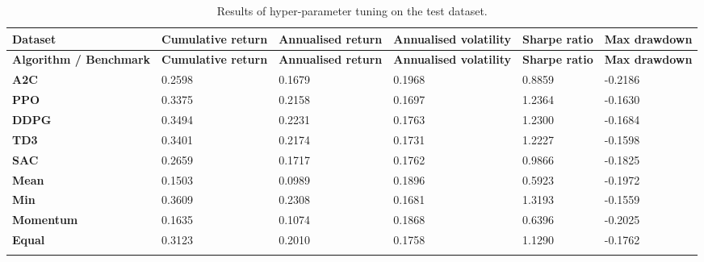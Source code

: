 \begin{longtable}{|p{2cm}|p{2.1cm}|p{2.1cm}|p{2.1cm}|p{1.5cm}|p{2cm}|}
    \hline
    \textbf{Dataset} & \textbf{Cumulative return} & \textbf{Annualised return} & \textbf{Annualised volatility} & \textbf{Sharpe ratio} & \textbf{Max drawdown}  \\ \midrule
    \endfirsthead

    \hline
    \textbf{Algorithm / Benchmark} & \textbf{Cumulative return} & \textbf{Annualised return} & \textbf{Annualised volatility} & \textbf{Sharpe ratio} & \textbf{Max drawdown}  \\ \midrule
    \endhead

    \endfoot
    \hline

        \textbf{A2C} & 0.2598 & 0.1679 & 0.1968 & 0.8859 & -0.2186 \\ \hline
        \textbf{PPO} & 0.3375 & 0.2158 & 0.1697 & 1.2364 & -0.1630 \\ \hline
        \textbf{DDPG} & 0.3494 & 0.2231 & 0.1763 & 1.2300 & -0.1684 \\ \hline
        \textbf{TD3} & 0.3401 & 0.2174 & 0.1731 & 1.2227 & -0.1598 \\ \hline
        \textbf{SAC} & 0.2659 & 0.1717 & 0.1762 & 0.9866 & -0.1825 \\ \hline
        \textbf{Mean} & 0.1503 & 0.0989 & 0.1896 & 0.5923 & -0.1972 \\ \hline
        \textbf{Min} & 0.3609 & 0.2308 & 0.1681 & 1.3193 & -0.1559 \\ \hline
        \textbf{Momentum} & 0.1635 & 0.1074 & 0.1868 & 0.6396 & -0.2025 \\ \hline
        \textbf{Equal} & 0.3123 & 0.2010 & 0.1758 & 1.1290 & -0.1762 \\ \hline

    \caption{Results of hyper-parameter tuning on the test dataset.}
    \label{tab:test_results}
\end{longtable}